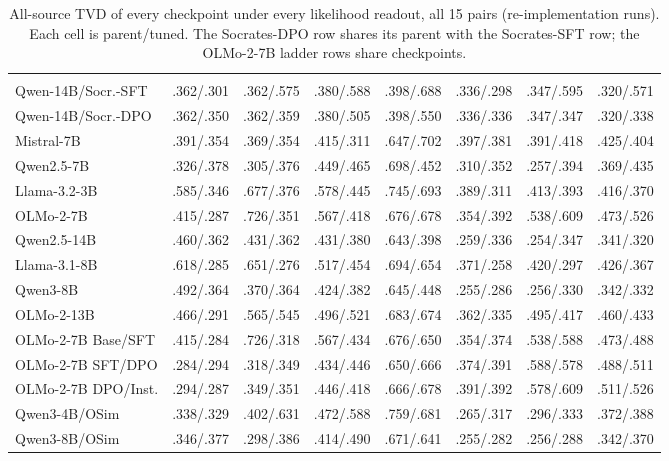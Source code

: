 \begin{table}[t]
\begin{tabular}{@{}lccccccc@{}}
\addlinespace
\multicolumn{8}{@{}l}{\emph{Pooled-cluster weighting (uniform predictor .394)}} \\
Qwen-14B/Socr.-SFT & .362/.301 & .362/.575 & .380/.588 & .398/.688 & .336/.298 & .347/.595 & .320/.571 \\
Qwen-14B/Socr.-DPO & .362/.350 & .362/.359 & .380/.505 & .398/.550 & .336/.336 & .347/.347 & .320/.338 \\
Mistral-7B & .391/.354 & .369/.354 & .415/.311 & .647/.702 & .397/.381 & .391/.418 & .425/.404 \\
Qwen2.5-7B & .326/.378 & .305/.376 & .449/.465 & .698/.452 & .310/.352 & .257/.394 & .369/.435 \\
Llama-3.2-3B & .585/.346 & .677/.376 & .578/.445 & .745/.693 & .389/.311 & .413/.393 & .416/.370 \\
OLMo-2-7B & .415/.287 & .726/.351 & .567/.418 & .676/.678 & .354/.392 & .538/.609 & .473/.526 \\
Qwen2.5-14B & .460/.362 & .431/.362 & .431/.380 & .643/.398 & .259/.336 & .254/.347 & .341/.320 \\
Llama-3.1-8B & .618/.285 & .651/.276 & .517/.454 & .694/.654 & .371/.258 & .420/.297 & .426/.367 \\
Qwen3-8B & .492/.364 & .370/.364 & .424/.382 & .645/.448 & .255/.286 & .256/.330 & .342/.332 \\
OLMo-2-13B & .466/.291 & .565/.545 & .496/.521 & .683/.674 & .362/.335 & .495/.417 & .460/.433 \\
OLMo-2-7B Base/SFT & .415/.284 & .726/.318 & .567/.434 & .676/.650 & .354/.374 & .538/.588 & .473/.488 \\
OLMo-2-7B SFT/DPO & .284/.294 & .318/.349 & .434/.446 & .650/.666 & .374/.391 & .588/.578 & .488/.511 \\
OLMo-2-7B DPO/Inst. & .294/.287 & .349/.351 & .446/.418 & .666/.678 & .391/.392 & .578/.609 & .511/.526 \\
Qwen3-4B/OSim & .338/.329 & .402/.631 & .472/.588 & .759/.681 & .265/.317 & .296/.333 & .372/.388 \\
Qwen3-8B/OSim & .346/.377 & .298/.386 & .414/.490 & .671/.641 & .255/.282 & .256/.288 & .342/.370 \\
\bottomrule
\end{tabular}
\caption{All-source TVD of every checkpoint under every likelihood readout, all 15 pairs (re-implementation runs). Each cell is parent/tuned. The Socrates-DPO row shares its parent with the Socrates-SFT row; the OLMo-2-7B ladder rows share checkpoints.}
\label{tab:all-pairs-absolute}
\end{table}
